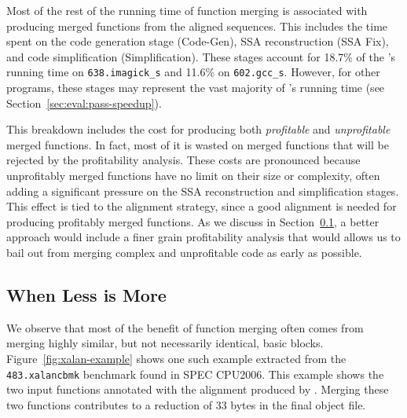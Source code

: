 Most of the rest of the running time of function merging is associated with producing merged functions from the aligned sequences.
This includes the time spent on the code generation stage (Code-Gen), SSA reconstruction (SSA Fix), and code simplification (Simplification). These stages account for 18.7\% of the {\SOAName}’s running time on \texttt{638.imagick\_s} and 11.6\% on \texttt{602.gcc\_s}.
However, for other programs, these stages may represent the vast majority of {\SOAName}’s running time (see Section~\ref{sec:eval:pass-speedup}).

This breakdown includes the cost for producing both \emph{profitable} and \emph{unprofitable} merged functions.
In fact, most of it is wasted on merged functions that will be rejected by the profitability analysis.
These costs are pronounced because unprofitably merged functions have no limit on their size or complexity, often adding a significant pressure on the SSA reconstruction and simplification stages.
This effect is tied to the alignment strategy, since a good alignment is needed for producing profitably merged functions.
As we discuss in Section~\ref{sec:motivation:less-more}, a better approach would include a finer grain profitability analysis that would allows us to bail out from merging complex and unprofitable code as early as possible.

\subsection{When Less is More} \label{sec:motivation:less-more}

We observe that most of the benefit of function merging often comes from merging highly similar, but not necessarily identical, basic blocks. Figure~\ref{fig:xalan-example} shows one such example extracted from the \texttt{483.xalancbmk} benchmark found in SPEC CPU2006.
This example shows the two input functions annotated with the alignment produced by \SOAName. Merging these two functions contributes to a reduction of 33 bytes in the final object file.

